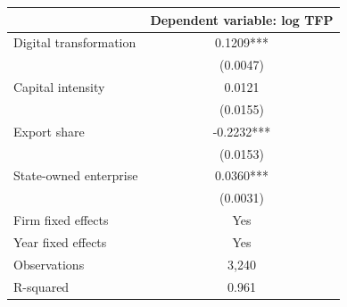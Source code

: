 \begin{tabular}{lc}
\toprule
 & Dependent variable: log TFP \\
\midrule
Digital transformation & 0.1209*** \\
 & (0.0047) \\
Capital intensity & 0.0121 \\
 & (0.0155) \\
Export share & -0.2232*** \\
 & (0.0153) \\
State-owned enterprise & 0.0360*** \\
 & (0.0031) \\
\midrule
Firm fixed effects & Yes \\
Year fixed effects & Yes \\
Observations & 3,240 \\
R-squared & 0.961 \\
\bottomrule
\end{tabular}

